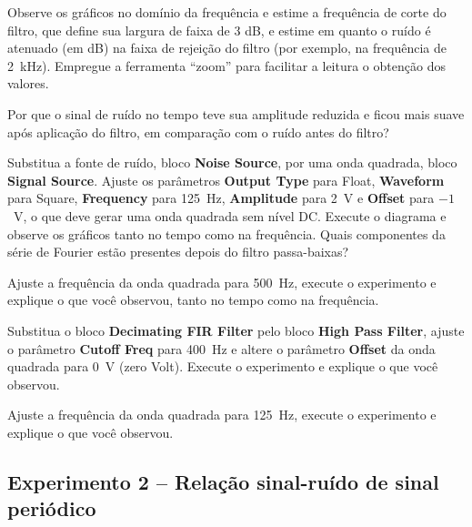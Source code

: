 \documentclass[12pt,addpoints]{exam}
\begin{document}
\begin{questions}
    \question Observe os gráficos no domínio da frequência e estime a frequência de corte do filtro, que define sua largura de faixa de 3 dB, e estime em quanto o ruído é atenuado (em dB) na faixa de rejeição do filtro (por exemplo, na frequência de 2~kHz). Empregue a ferramenta ``zoom'' para facilitar a leitura o obtenção dos valores.
    \fillwithlines{0.25in}
    
    \question Por que o sinal de ruído no tempo teve sua amplitude reduzida e ficou mais suave após aplicação do filtro, em comparação com o ruído antes do filtro?
    \fillwithlines{0.5in}

    \question Substitua a fonte de ruído, bloco \textbf{Noise Source}, por uma onda quadrada, bloco \textbf{Signal Source}. Ajuste os parâmetros \textbf{Output Type} para Float, \textbf{Waveform} para Square, \textbf{Frequency} para 125~Hz, \textbf{Amplitude} para 2~V e \textbf{Offset} para $-1$~V, o que deve gerar uma onda quadrada sem nível DC. Execute o diagrama e observe os gráficos tanto no tempo como na frequência. Quais componentes da série de Fourier estão presentes depois do filtro passa-baixas?
    \fillwithlines{0.5in}
    
    \question Ajuste a frequência da onda quadrada para 500~Hz, execute o experimento e explique o que você observou, tanto no tempo como na frequência.
    \fillwithlines{0.5in}
    
    \question Substitua o bloco \textbf{Decimating FIR Filter} pelo bloco \textbf{High Pass Filter}, ajuste o parâmetro \textbf{Cutoff Freq} para 400~Hz e altere o parâmetro \textbf{Offset} da onda quadrada para 0~V (zero Volt). Execute o experimento e explique o que você observou.
    \fillwithlines{0.5in}
    
    \question Ajuste a frequência da onda quadrada para 125~Hz, execute o experimento e explique o que você observou.
    \fillwithlines{0.5in}
\end{questions}

\subsection*{Experimento 2 -- Relação sinal-ruído de sinal periódico}
\end{document}
